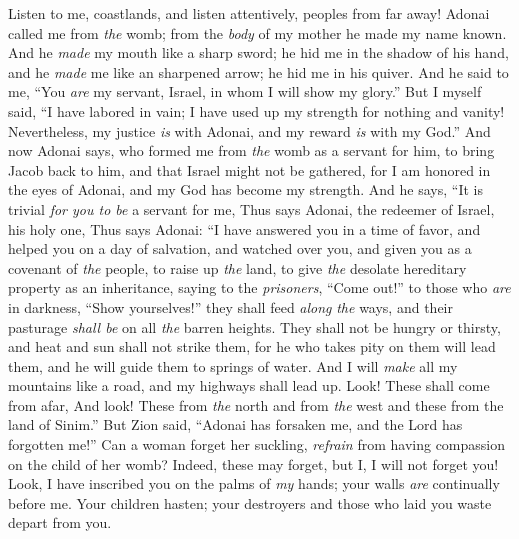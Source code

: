 \begin{biblechapter} %
 Listen to me, coastlands, 
and listen attentively, peoples from far away! 
Adonai called me from \textit{the} womb; 
from the \textit{body} of my mother he made my name known.
\verse And he \textit{made} my mouth like a sharp sword; 
he hid me in the shadow of his hand, 
and he \textit{made} me like an sharpened arrow; 
he hid me in his quiver.
\verse And he said to me, “You \textit{are} my servant, 
Israel, in whom I will show my glory.”
\verse But I myself said, “I have labored in vain; 
I have used up my strength for nothing and vanity! 
Nevertheless, my justice \textit{is} with Adonai, 
and my reward \textit{is} with my God.”
\verse And now Adonai says, 
who formed me from \textit{the} womb as a servant for him, 
to bring Jacob back to him, 
and that Israel might not be gathered, 
for I am honored in the eyes of Adonai, 
and my God has become my strength.
\verse And he says, “It is trivial \textit{for you to be} a servant for me,
\verse Thus says Adonai, the redeemer of Israel, his holy one,
 Thus says Adonai:
\verse “I have answered you in a time of favor, 
and helped you on a day of salvation, 
and watched over you, 
and given you as a covenant of \textit{the} people, 
to raise up \textit{the} land, 
to give \textit{the} desolate hereditary property as an inheritance,
\verse saying to the \textit{prisoners}, “Come out!” 
to those who \textit{are} in darkness, “Show yourselves!” 
they shall feed \textit{along} \textit{the} ways, 
and their pasturage \textit{shall be} on all \textit{the} barren heights.
\verse They shall not be hungry or thirsty, 
and heat and sun shall not strike them, 
for he who takes pity on them will lead them, 
and he will guide them to springs of water.
\verse And I will \textit{make} all my mountains like a road, 
and my highways shall lead up.
\verse Look! These shall come from afar, 
And look! These from \textit{the} north and from \textit{the} west 
and these from the land of Sinim.”
 But Zion said, “Adonai has forsaken me, 
and the Lord has forgotten me!”
\verse Can a woman forget her suckling, 
\textit{refrain} from having compassion on the child of her womb? 
Indeed, these may forget, 
but I, I will not forget you!
\verse Look, I have inscribed you on the palms of \textit{my} hands; 
your walls \textit{are} continually before me.
\verse Your children hasten; 
your destroyers and those who laid you waste depart from you.

\end{biblechapter}
